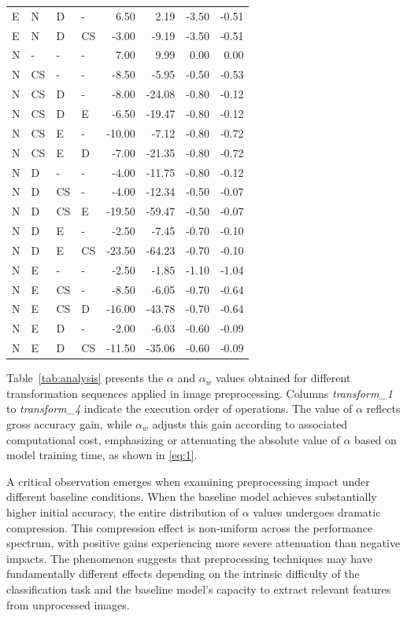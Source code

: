 \documentclass[journal]{IEEEtran}
\begin{document}
\begin{table}[h!t]
\begin{tabular*}{\textwidth}{@{\extracolsep{\fill}} l l l l r r r r @{}}
E & N & D & - & 6.50 & 2.19 & -3.50 & -0.51 \\
E & N & D & CS & -3.00 & -9.19 & -3.50 & -0.51 \\
N & - & - & - & 7.00 & 9.99 & 0.00 & 0.00 \\
N & CS & - & - & -8.50 & -5.95 & -0.50 & -0.53 \\
N & CS & D & - & -8.00 & -24.08 & -0.80 & -0.12 \\
N & CS & D & E & -6.50 & -19.47 & -0.80 & -0.12 \\
N & CS & E & - & -10.00 & -7.12 & -0.80 & -0.72 \\
N & CS & E & D & -7.00 & -21.35 & -0.80 & -0.72 \\
N & D & - & - & -4.00 & -11.75 & -0.80 & -0.12 \\
N & D & CS & - & -4.00 & -12.34 & -0.50 & -0.07 \\
N & D & CS & E & -19.50 & -59.47 & -0.50 & -0.07 \\
N & D & E & - & -2.50 & -7.45 & -0.70 & -0.10 \\
N & D & E & CS & -23.50 & -64.23 & -0.70 & -0.10 \\
N & E & - & - & -2.50 & -1.85 & -1.10 & -1.04 \\
N & E & CS & - & -8.50 & -6.05 & -0.70 & -0.64 \\
N & E & CS & D & -16.00 & -43.78 & -0.70 & -0.64 \\
N & E & D & - & -2.00 & -6.03 & -0.60 & -0.09 \\
N & E & D & CS & -11.50 & -35.06 & -0.60 & -0.09 \\
\bottomrule
\end{tabular*}
\end{table}

Table~\ref{tab:analysis} presents the $\alpha$ and $\alpha_w$ values obtained for different transformation sequences applied in image preprocessing. Columns \emph{transform\_1} to \emph{transform\_4} indicate the execution order of operations. The value of $\alpha$ reflects gross accuracy gain, while $\alpha_w$ adjusts this gain according to associated computational cost, emphasizing or attenuating the absolute value of $\alpha$ based on model training time, as shown in \eqref{eq:1}.

A critical observation emerges when examining preprocessing impact under different baseline conditions. When the baseline model achieves substantially higher initial accuracy, the entire distribution of $\alpha$ values undergoes dramatic compression. This compression effect is non-uniform across the performance spectrum, with positive gains experiencing more severe attenuation than negative impacts. The phenomenon suggests that preprocessing techniques may have fundamentally different effects depending on the intrinsic difficulty of the classification task and the baseline model's capacity to extract relevant features from unprocessed images.
\end{document}
